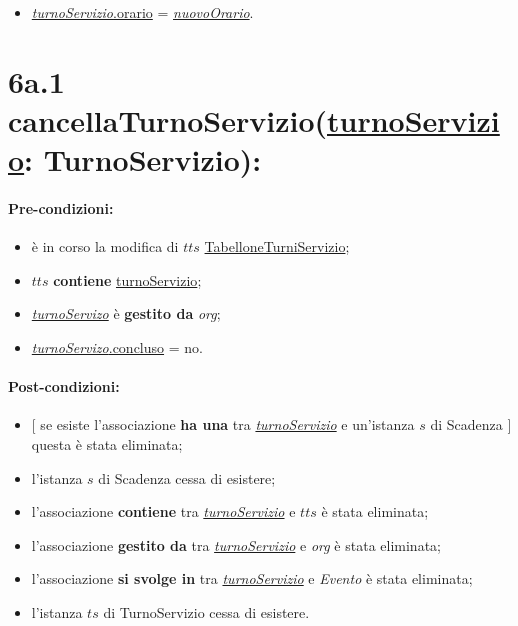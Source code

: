 \begin{itemize}
    \item \underline{\textit{turnoServizio}.orario} = \underline{\textit{nuovoOrario}}.
\end{itemize}

\section*{6a.1 cancellaTurnoServizio(\underline{turnoServizio}: TurnoServizio):}

\paragraph{Pre-condizioni:}
\begin{itemize}
 \item è in corso la modifica di $tts$ \underline{TabelloneTurniServizio};
 \item $tts$ \textbf{contiene} \underline{turnoServizio};
   \item \underline{\textit{turnoServizo}} è \textbf{gestito da} {\textit{org}};
   \item \underline{\textit{turnoServizo}.concluso} = no.
\end{itemize}

\paragraph{Post-condizioni:} 
\begin{itemize}
    \item $[$ se esiste l'associazione \textbf{ha una} tra \underline{\textit{turnoServizio}} e un'istanza $s$ di Scadenza $]$ questa è stata eliminata;
 \item l'istanza $s$ di Scadenza cessa di esistere;
  \item l'associazione \textbf{contiene} tra \underline{\textit{turnoServizio}} e $tts$ è stata eliminata;
 \item l'associazione \textbf{gestito da} tra \underline{\textit{turnoServizio}} e \textit{org} è stata eliminata;
\item l'associazione \textbf{si svolge in} tra \underline{\textit{turnoServizio}} e \textit{Evento} è stata eliminata;
 \item l'istanza $ts$ di TurnoServizio cessa di esistere.
\end{itemize}
